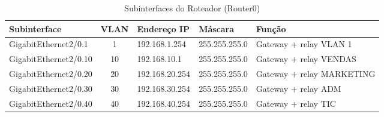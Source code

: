 \begin{table}[htbp]
\centering
\caption{Subinterfaces do Roteador (Router0)}
\label{tab:subinterfaces}
\small
\begin{tabular}{@{}p{3.8cm}cllp{3.2cm}@{}}
\toprule
\textbf{Subinterface} & \textbf{VLAN} & \textbf{Endereço IP} &
\textbf{Máscara} & \textbf{Função} \\
\midrule
GigabitEthernet2/0.1  & 1  & 192.168.1.254   & 255.255.255.0 & Gateway + relay VLAN 1 \\
GigabitEthernet2/0.10 & 10 & 192.168.10.1    & 255.255.255.0 & Gateway + relay VENDAS \\
GigabitEthernet2/0.20 & 20 & 192.168.20.254  & 255.255.255.0 & Gateway + relay MARKETING \\
GigabitEthernet2/0.30 & 30 & 192.168.30.254  & 255.255.255.0 & Gateway + relay ADM \\
GigabitEthernet2/0.40 & 40 & 192.168.40.254  & 255.255.255.0 & Gateway + relay TIC \\
\bottomrule
\end{tabular}
\end{table}

\clearpage